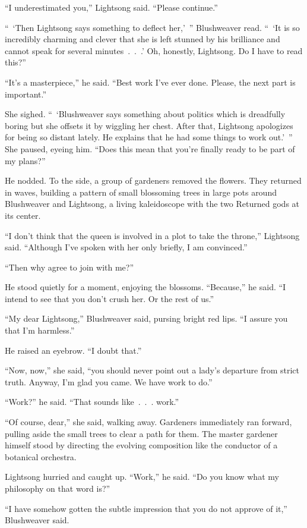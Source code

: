 “I underestimated you,” Lightsong said. “Please continue.”

“~‘Then Lightsong says something to deflect her,’~” Blushweaver read. “~‘It is so incredibly charming and clever that she is left stunned by his brilliance and cannot speak for several minutes~.~.~.’ Oh, honestly, Lightsong. Do I have to read this?”

“It’s a masterpiece,” he said. “Best work I’ve ever done. Please, the next part is important.”

She sighed. “~‘Blushweaver says something about politics which is dreadfully boring but she offsets it by wiggling her chest. After that, Lightsong apologizes for being so distant lately. He explains that he had some things to work out.’~” She paused, eyeing him. “Does this mean that you’re finally ready to be part of my plans?”

He nodded. To the side, a group of gardeners removed the flowers. They returned in waves, building a pattern of small blossoming trees in large pots around Blushweaver and Lightsong, a living kaleidoscope with the two Returned gods at its center.

“I don’t think that the queen is involved in a plot to take the throne,” Lightsong said. “Although I’ve spoken with her only briefly, I am convinced.”

“Then why agree to join with me?”

He stood quietly for a moment, enjoying the blossoms. “Because,” he said. “I intend to see that you don’t crush her. Or the rest of us.”

“My dear Lightsong,” Blushweaver said, pursing bright red lips. “I assure you that I’m harmless.”

He raised an eyebrow. “I doubt that.”

“Now, now,” she said, “you should never point out a lady’s departure from strict truth. Anyway, I’m glad you came. We have work to do.”

“Work?” he said. “That sounds like~.~.~. work.”

“Of course, dear,” she said, walking away. Gardeners immediately ran forward, pulling aside the small trees to clear a path for them. The master gardener himself stood by directing the evolving composition like the conductor of a botanical orchestra.

Lightsong hurried and caught up. “Work,” he said. “Do you know what my philosophy on that word is?”

“I have somehow gotten the subtle impression that you do not approve of it,” Blushweaver said.

